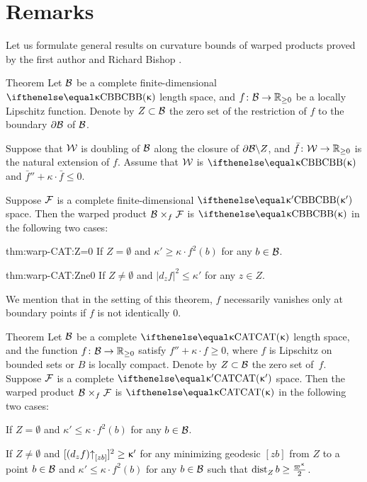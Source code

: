 \section{Remarks}


Let us formulate general results on curvature bounds of warped products 
proved by the first author and Richard Bishop \cite{alexander-bishop:warps}.

\begin{thm}{Theorem}\label{thm:warp-CBB}
Let $\mathcal{B}$ be a complete finite-dimensional $\Alex\kappa$ length space, and $f\:{\spc{B}}\to \RR_{\ge0}$ be a locally Lipschitz function.
Denote by $Z\subset \spc{B}$ the zero set of the restriction of $f$ to the boundary $\partial \mathcal{B}$ of $\mathcal{B}$.

Suppose that $\mathcal{W}$ is doubling of $\mathcal{B}$ along the closure of $\partial \mathcal{B}\backslash Z$, and $\bar f\: \spc{W}\to\RR_{\ge0}$ is the natural extension of $f$.
Assume that $\mathcal{W}$ is $\Alex\kappa$ 
and $\bar f''+\kappa\cdot \bar f\le 0$.

Suppose $\mathcal{F}$ is a complete finite-dimensional $\Alex{\kappa'}$ space.
Then the warped product $\spc{B}\warp f\spc{F}$ is $\Alex\kappa$ in the following two cases:
\begin{subthm}{thm:warp-CAT:Z=0}
If $Z= \emptyset$ and 
$\kappa'\ge \kappa\cdot f^2(b)$
for any $b\in \spc{B}$.
\end{subthm}

\begin{subthm}{thm:warp-CAT:Zne0}
If $Z\ne \emptyset$ and
$|d_zf|^2\le\kappa'$
for any $z\in Z$.
\end{subthm}

\end{thm}

We mention that in the setting of this theorem, $f$ necessarily vanishes only at boundary points if $f$ is not identically $0$.

\begin{thm}{Theorem}\label{thm:warp-CAT}
Let $\mathcal{B}$ be a 
complete 
$\CAT\kappa$ length space, and the function $f\:\spc{B}\to \RR_{\ge0}$ satisfy $f''+\kappa\cdot f\ge 0$, 
where $f$ is Lipschitz on bounded sets or $B$ is locally compact.
Denote by $Z\subset \spc{B}$ the zero set of~$f$.
Suppose $\mathcal{F}$ is a 
complete $\CAT{\kappa'}$ space.
Then the warped product $\spc{B}\warp f\spc{F}$ is $\CAT\kappa$ in the following two cases:
\begin{subthm}{}
If $Z= \emptyset$ and $\kappa'\le \kappa\cdot f^2(b)$ for any $b\in \spc{B}$.
\end{subthm}

\begin{subthm}{}
If $Z\ne \emptyset$ and $[(d_zf)\dir zb]^2\ge\kappa'$ for any minimizing geodesic $[zb]$ from $Z$ to a point $b\in\spc{B}$ and 
$\kappa'\le \kappa\cdot f^2(b)$ for any $b\in \spc{B}$ such that $\distfun{Z}{b}{}\ge \tfrac{\varpi\kappa}2$.
\end{subthm}

\end{thm}
